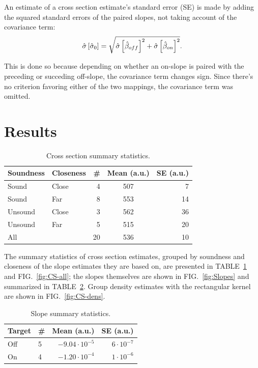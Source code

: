 \documentclass[reprint]{revtex4-1}
\begin{document}
An estimate of a cross section estimate's standard error (SE) is made by adding the squared standard errors of the paired slopes, not taking account of the covariance term:
\begin{equation}
	\SE*{\CS*[0]} = \sqrt{\SE*{\slp*[off]}^2 + \SE*{\slp*[on]}^2}.
\end{equation}

This is done so because depending on whether an on-slope is paired with the preceding or succeding off-slope, the covariance term changes sign. Since there's no criterion favoring either of the two mappings, the covariance term was omitted.

\section{Results}
\begin{table}
\centering
\caption{Cross section summary statistics. \label{tbl:CS-all}}
\begin{tabular}{llrcr}
\hline\hline
Soundness	& Closeness		& \#		& Mean (a.u.)		& SE (a.u.) \\
\hline
Sound		& Close			& 4			& 507				& 7  \\
Sound		& Far			& 8			& 553				& 14 \\
Unsound		& Close			& 3			& 562				& 36 \\
Unsound		& Far			& 5			& 515				& 20 \\
\hline
All			& 				& 20		& 536				& 10 \\
\end{tabular}
\end{table}

The summary statistics of cross section estimates, grouped by soundness and closeness of the slope estimates they are based on, are presented in TABLE~\ref{tbl:CS-all} and FIG.~\ref{fig:CS-all}; the slopes themselves are shown in FIG.~\ref{fig:Slopes} and summarized in TABLE~\ref{tbl:Slp-big}. Group density estimates with the rectangular kernel are shown in FIG.~\ref{fig:CS-dens}.

\begin{table}
\centering
\caption{Slope summary statistics. \label{tbl:Slp-big}}
\begin{tabular}{llrr}
\hline\hline
Target		& \#		& Mean (a.u.)						& SE (a.u.) \\
\hline
Off			& 5			& $-9.04\cdot 10^{-5}$				& $6\cdot 10^{-7}$  \\
On			& 4			& $-1.20\cdot 10^{-4}$				& $1\cdot 10^{-6}$ \\
\end{tabular}
\end{table}
\end{document}
